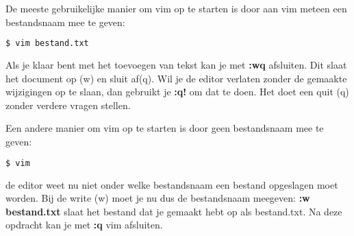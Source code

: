 De meeste gebruikelijke manier om vim op te starten is door aan vim meteen een bestandsnaam mee te geven:
\begin{lstlisting}[language=bash]
$ vim bestand.txt
\end{lstlisting}
Als je klaar bent met het toevoegen van tekst kan je met \textbf{:wq} afsluiten. Dit slaat het document op (w) en sluit af(q). Wil je de editor verlaten zonder de gemaakte wijzigingen op te slaan, dan gebruikt je \textbf{:q!} om dat te doen. Het doet een quit (q) zonder verdere vragen stellen.

Een andere manier om vim op te starten is door geen bestandsnaam mee te geven:
\begin{lstlisting}[language=bash]
$ vim
\end{lstlisting}
de editor weet nu niet onder welke bestandsnaam een bestand opgeslagen moet worden. Bij de write (w) moet je nu dus de bestandsnaam meegeven: \textbf{:w bestand.txt} slaat het bestand dat je gemaakt hebt op als bestand.txt. Na deze opdracht kan je met \textbf{:q} vim afsluiten.
